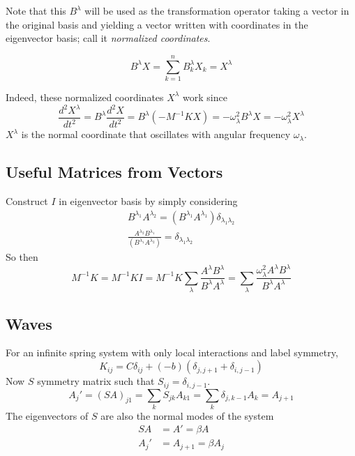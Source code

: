 \documentclass[twoside, 10pt]{amsart}
\begin{document}
Note that this $B^{\lambda}$ will be used as the transformation operator taking a vector in the original basis and yielding a vector written with coordinates in the eigenvector basis; call it \emph{normalized coordinates}.  

\begin{equation}
  B^{\lambda} X = \sum_{k=1}^n B_k^{\lambda} X_k = X^{\lambda}
\end{equation}

Indeed, these normalized coordinates $X^{\lambda}$ work since
\[
\frac{d^2X^{\lambda}}{ dt^2 } = B^{\lambda} \frac{d^2 X}{dt^2}  = B^{\lambda} (- M^{-1}K X) = -\omega_{\lambda}^2 B^{\lambda} X = -\omega_{\lambda}^2 X^{\lambda}
\]
$X^{\lambda}$ is the normal coordinate that oscillates with angular frequency $\omega_{\lambda}$.

\subsection{ Useful Matrices from Vectors }
Construct $I$ in eigenvector basis by simply considering 
\[
\begin{gathered}
  B^{\lambda_1} A^{\lambda_2} = (B^{\lambda_1}  A^{\lambda_1} ) \delta_{\lambda_1 \lambda_2 }   \\
  \frac{ A^{\lambda_2} B^{\lambda_1} }{ (B^{\lambda_1} A^{\lambda_2 } )} = \delta_{\lambda_1 \lambda_2}
\end{gathered}
\]
So then
\[
M^{-1} K = M^{-1}K I = M^{-1} K \sum_{\lambda} \frac{ A^{\lambda}B^{\lambda} }{ B^{\lambda} A^{\lambda} } =\sum_{\lambda} \frac{ \omega_{\lambda}^2 A^{\lambda} B^{\lambda} }{ B^{\lambda} A^{\lambda} } 
\]

\subsection{ Waves }

For an infinite spring system with only local interactions and label symmetry, 
\begin{equation}
  K_{ij} = C \delta_{ij} + (-b)( \delta_{j,j+1} + \delta_{i,j-1} )
\end{equation}
Now $S$ symmetry matrix such that $S_{ij} = \delta_{i,j-1}$.  
\[
A_j' = (SA)_{j1} = \sum_k S_{jk} A_{k1} = \sum_k \delta_{j,k-1} A_k =A_{j+1}  
\]
The eigenvectors of $S$ are also the normal modes of the system 
\[
\begin{aligned}
SA & = A' = \beta A  \\
A_j' & = A_{j+1} = \beta A_j 
\end{aligned}
\]
\end{document}
